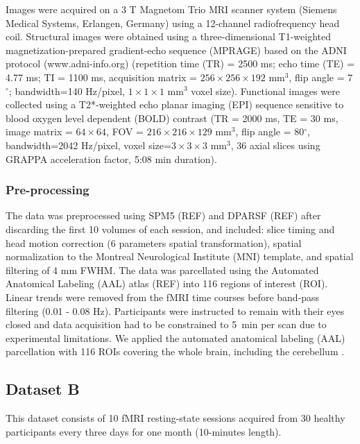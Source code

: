 \documentclass{article}
\begin{document}
Images were acquired on a 3 T Magnetom Trio MRI scanner system (Siemens Medical Systems, Erlangen, Germany) using a 12-channel radiofrequency head coil. Structural images were obtained using a three-dimensional T1-weighted magnetization-prepared gradient-echo sequence (MPRAGE) based on the ADNI protocol (www.adni-info.org) (repetition time (TR) = 2500 ms; echo time (TE) = 4.77 ms; TI = 1100 ms, acquisition matrix = $256 \times 256 \times 192$ mm$^3$, flip angle = 7$^\circ$; bandwidth=140 Hz/pixel, $1 \times 1 \times 1$ mm$^3$ voxel size). Functional images were collected using a T2*-weighted echo planar imaging (EPI) sequence sensitive to blood oxygen level dependent (BOLD) contrast (TR = 2000 ms, TE = 30 ms, image matrix = $64 \times 64$, FOV = $216 \times 216 \times 129$ mm$^3$, flip angle = 80$^\circ$, bandwidth=2042 Hz/pixel, voxel size=$3 \times 3 \times 3$ mm$^3$, 36 axial slices using GRAPPA acceleration factor, 5:08 min duration).

\subsubsection{Pre-processing}

The data was preprocessed using SPM5 (REF) and DPARSF (REF) after discarding the first 10 volumes of each session, and included: slice timing and head motion correction (6 parameters spatial transformation), spatial normalization to the Montreal Neurological Institute (MNI) template, and spatial filtering of 4 mm FWHM. The data was parcellated using the Automated Anatomical Labeling (AAL) atlas (REF) into 116 regions of interest (ROI). Linear trends were removed from the fMRI time courses before band-pass filtering (0.01 - 0.08 Hz). Participants were instructed to remain with their eyes closed and data acquisition had to be constrained to 5~min per scan due to experimental limitations. 
We applied the automated anatomical labeling (AAL) parcellation with 116 ROIs covering the whole brain, including the cerebellum \cite{Tzourio2002}.


\subsection{Dataset B}

This dataset consists of 10 fMRI resting-state sessions acquired from 30 healthy participants every three days for one month (10-minutes length). 
\end{document}
